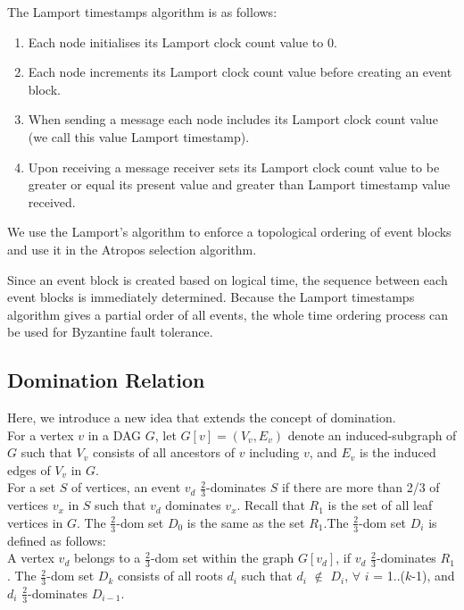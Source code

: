 \documentclass{article}
\begin{document}
The Lamport timestamps algorithm is as follows:

\begin{enumerate}
\item Each node initialises its Lamport clock count value to $0$.
\item Each node increments its Lamport clock count value before creating an event block.
\item When sending a message each node includes its Lamport clock count value (we call this value Lamport timestamp).
\item Upon receiving a message receiver sets its Lamport clock count value to be greater or equal its present value and greater than Lamport timestamp value received.
\end{enumerate}


We use the Lamport's algorithm to enforce a topological ordering of event blocks and use it in the Atropos selection algorithm. 

Since an event block is created based on logical time, the sequence between each event blocks is immediately determined. Because the Lamport timestamps algorithm gives a partial order of all events, the whole time ordering process can be used for Byzantine fault tolerance.

\subsection{Domination Relation}

Here, we introduce a new idea that extends the concept of domination.\\

For a vertex $v$ in a DAG $G$, let $G[v] = (V_v,E_v)$ denote an induced-subgraph of $G$ such that $V_v$ consists of all ancestors of $v$ including $v$, and $E_v$ is the induced edges of $V_v$ in $G$.\\

For a set $S$ of vertices, an event $v_d$  $\frac{2}{3}$-dominates $S$ if there are more than 2/3 of vertices $v_x$ in $S$ such that $v_d$ dominates $v_x$. 	
Recall that $R_1$ is the set of all leaf vertices in $G$. The $\frac{2}{3}$-dom set $D_0$ is the same as the set $R_1$.The $\frac{2}{3}$-dom set $D_i$ is defined as follows:	\\

A vertex $v_d$ belongs to a $\frac{2}{3}$-dom set within the graph $G[v_d]$, if $v_d$ $\frac{2}{3}$-dominates $R_1$.
	The $\frac{2}{3}$-dom set $D_k$ consists of all roots $d_i$ such that  $d_i$ $\not \in $ $D_i$, $\forall$ $i$ = 1..($k$-1), and $d_i$ $\frac{2}{3}$-dominates $D_{i-1}$.\\
	
\end{document}
